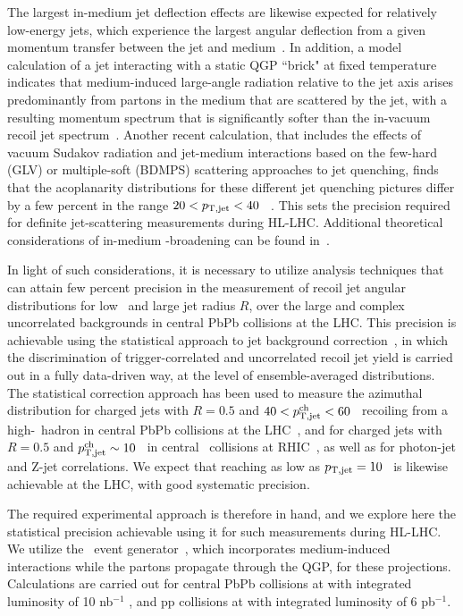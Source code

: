 The largest in-medium jet deflection effects are likewise expected for relatively low-energy jets, which experience the largest angular deflection from a given momentum transfer between the jet and medium~\cite{DEramo:2018eoy,Gyulassy:2018qhr}. In addition, a model calculation of a jet interacting with a static QGP ``brick" at fixed temperature indicates that medium-induced large-angle radiation relative to the jet axis arises predominantly from partons in the medium that are scattered by the jet, with a resulting momentum spectrum that is significantly softer than the in-vacuum recoil jet spectrum~\cite{DEramo:2018eoy}. Another recent calculation, that includes the effects of vacuum Sudakov radiation and jet-medium interactions based on the few-hard (GLV) or multiple-soft (BDMPS) scattering approaches to jet quenching, finds that the acoplanarity distributions for these different jet quenching pictures differ by a few percent in the range $20<p_{\mathrm{T,jet}}<40$ \gevc~\cite{Gyulassy:2018qhr}. This sets the precision required for definite jet-scattering measurements during HL-LHC. Additional theoretical considerations of in-medium \pT-broadening can be found in~\cite{Zakharov:2018rst,Ghiglieri:2018ltw}.

In light of such considerations, it is necessary to utilize analysis techniques that can attain few percent precision in the measurement of recoil jet angular distributions for low \ptjet\ and large jet radius $R$, over the large and complex uncorrelated backgrounds in central PbPb collisions at the LHC. This precision is achievable using the statistical approach to jet background correction~\cite{Adam:2015doa,Adamczyk:2017yhe,Sirunyan:2017jic,Sirunyan:2017qhf}, in which the discrimination of trigger-correlated and uncorrelated recoil jet yield is carried out in a fully data-driven way, at the level of ensemble-averaged distributions. The statistical correction approach has been used to measure the azimuthal distribution for charged jets with $R=0.5$ and $40<p_{\mathrm{T,jet}}^{\mathrm{ch}}<60$ \gevc\ recoiling from a high-\pt\ hadron in central PbPb collisions at the LHC~\cite{Adam:2015doa}, and for charged jets with $R=0.5$ and $p_{\mathrm{T,jet}}^{\mathrm{ch}}\sim10$ \gevc\ in central \AuAu\ collisions at RHIC~\cite{Adamczyk:2017yhe}, as well as for photon-jet and Z-jet correlations. We expect that reaching as low as $p_{\mathrm{T,jet}}=10$ \gevc\ is likewise achievable at the LHC, with good systematic precision. 

The required experimental approach is therefore in hand, and we explore here the statistical precision achievable using it for such measurements during HL-LHC. 
We utilize the \jewel\ event generator~\cite{Zapp:2013vla}, which incorporates medium-induced interactions while the partons propagate through the QGP, for these projections. Calculations are carried out for central PbPb collisions at  with integrated luminosity of 10 nb$^{-1}$ , and pp collisions at  with integrated luminosity of 6 pb$^{-1}$. 

